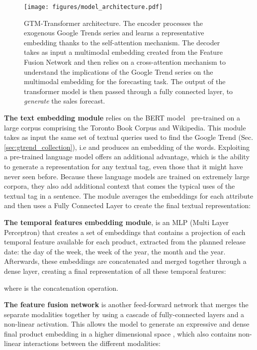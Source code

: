 \documentclass{article}
\newcommand{\approachname}[0] {GTM-Transformer\xspace}
\begin{document}
\begin{figure}[t]
    \centering
    \texttt{[image: figures/model\_architecture.pdf]}
    \caption{\approachname{} architecture. The encoder processes the exogenous Google Trends series and learns a representative embedding thanks to the self-attention mechanism. The decoder takes as input a multimodal embedding created from the Feature Fusion Network and then relies on a cross-attention mechanism to understand the implications of the Google Trend series on the multimodal embedding for the forecasting task. The output of the transformer model is then passed through a fully connected layer, to \textit{generate} the sales forecast.}
    \label{fig:model_architecture}
\end{figure}

\textbf{The text embedding module} relies on the BERT model~\cite{devlin2019bert} pre-trained on a large corpus comprising the Toronto Book Corpus and Wikipedia. This module takes as input the same set of textual queries used to find the Google Trend (Sec. \ref{sec:gtrend_collection}), i.e  and produces an embedding  of the words. Exploiting a pre-trained language model offers an additional advantage, which is the ability to generate a representation for any textual tag, even those that it might have never seen before. Because these language models are trained on extremely large corpora, they also add additional context that comes the typical uses of the textual tag in a sentence. The module averages the embeddings for each attribute and then uses a Fully Connected Layer to create the final textual representation: 


\textbf{The temporal features embedding module}, is an MLP (Multi Layer Perceptron) that creates a set of embeddings  that contains a projection of each temporal feature available for each product, extracted from the planned release date: the day of the week, the week of the year, the month and the year. Afterwards, these embeddings are concatenated and merged together through a dense layer, creating a final representation of all these temporal features:

 where  is the concatenation operation.

\textbf{The feature fusion network} is another feed-forward network that merges the separate modalities together by using a cascade of fully-connected layers and a non-linear activation. This allows the model to generate an expressive and dense final product embedding in a higher dimensional space , which also contains non-linear interactions between the different modalities:
\end{document}

